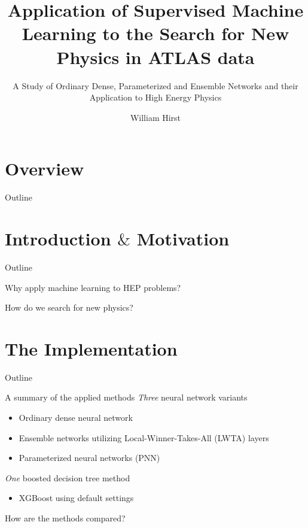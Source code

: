 \documentclass[UKenglish]{beamer}
\author{William Hirst}
\title[Supervised Learning in HEP]{Application of Supervised Machine Learning to the Search for New Physics in ATLAS data}
\subtitle{A Study of Ordinary Dense, Parameterized and Ensemble Networks and their Application to High Energy Physics}
\begin{document}
\section{Overview}

\begin{frame}{Outline}
    \tableofcontents
\end{frame}


\section{Introduction $\&$ Motivation}
\begin{frame}{Outline}
    \tableofcontents[currentsection]
\end{frame}

\begin{frame}{Why apply machine learning to HEP problems?}
 
\end{frame}


\begin{frame}{How do we search for new physics?}
 
\end{frame}

\section{The Implementation}
\begin{frame}{Outline}
    \tableofcontents[currentsection]
\end{frame}

\begin{frame}{A summary of the applied methods}
    \emph{Three} neural network variants
    \begin{itemize}
        \item Ordinary dense neural network
        \item Ensemble networks utilizing Local-Winner-Takes-All (LWTA) layers
        \item Parameterized neural networks (PNN)
    \end{itemize}
    \emph{One} boosted decision tree method
    \begin{itemize}
        \item XGBoost using default settings
    \end{itemize}
\end{frame}

\begin{frame}{How are the methods compared?}

\end{frame}
\end{document}
